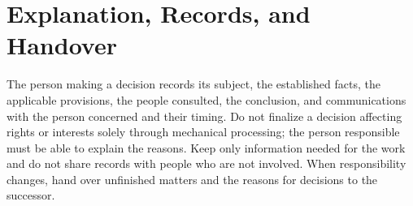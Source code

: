 \section{Explanation, Records, and Handover}

The person making a decision records its subject, the established facts, the applicable provisions, the people consulted, the conclusion, and communications with the person concerned and their timing.
Do not finalize a decision affecting rights or interests solely through mechanical processing; the person responsible must be able to explain the reasons.
Keep only information needed for the work and do not share records with people who are not involved.
When responsibility changes, hand over unfinished matters and the reasons for decisions to the successor.

